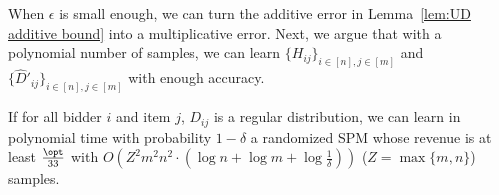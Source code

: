 	When $\epsilon$ is small enough, we can turn the additive error in Lemma~\ref{lem:UD additive bound} into a multiplicative error. Next, we argue that with a polynomial number of samples, we can learn $\{H_{ij}\}_{i\in[n],j\in[m]}$ and $\{\hat{D}'_{ij}\}_{i\in[n],j\in[m]}$ with enough accuracy.

\begin{theorem}\label{thm:UD regular}
If for all bidder $i$ and item $j$, $D_{ij}$ is a regular distribution, we can learn in polynomial time with probability $1-\delta$ a randomized SPM whose revenue is at least $\frac{\opt}{33}$ with $O\left(Z^2m^2 n^2\cdot \left(\log n +\log m + \log \frac{1}{\delta}\right)\right)$ ($Z=\max\{m,n\}$) samples. %
\end{theorem}
